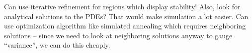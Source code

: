 \documentclass[10pt]{article}
\begin{document}
Can use iterative refinement for regions which display stability! Also, look for analytical solutions to the PDEs? That would make simulation a lot easier. Can use optimization algorithm like simulated annealing which requires neighboring solutions -- since we need to look at neighboring solutions anyway to gauge ``variance'', we can do this cheaply.
\end{document}
